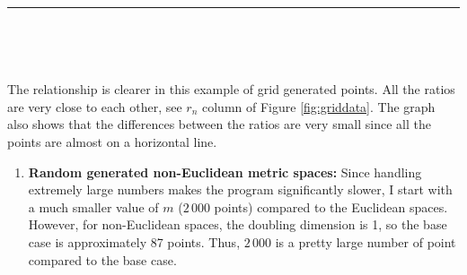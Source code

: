 \documentclass[12pt,english,]{article}
\providecommand{\tightlist}{%
  \setlength{\itemsep}{0pt}\setlength{\parskip}{0pt}}
\let\origfigure\figure
\let\endorigfigure\endfigure
\renewenvironment{figure}[1][2] {
    \expandafter\origfigure\expandafter[H]
} {
    \endorigfigure
}
\begin{document}
\begin{figure}
\begin{minipage}{0.95\textwidth}
\begin{center}
\end{center}
\end{minipage}
\caption[Caption]{The graph of ratios $r_n$ versus different values of $n$ of grid points with $n \in \{200\,000, 400\,000, 800\,000, 1\,600\,000, 3\,200\,000\}$ (with y-scale = $10^{-3}$).}
\label{fig:gridgraph}
\end{figure}

\hrule

~

~

The relationship is clearer in this example of grid generated points.
All the ratios are very close to each other, see \(r_n\) column of
Figure \ref{fig:griddata}. The graph also shows that the differences
between the ratios are very small since all the points are almost on a
horizontal line.

\begin{enumerate}
\def\labelenumi{\arabic{enumi}.}
\setcounter{enumi}{2}
\tightlist
\item
  \textbf{Random generated non-Euclidean metric spaces:} Since handling
  extremely large numbers makes the program significantly slower, I
  start with a much smaller value of \(m\) (\(2\,000\) points) compared
  to the Euclidean spaces. However, for non-Euclidean spaces, the
  doubling dimension is 1, so the base case is approximately 87 points.
  Thus, \(2\,000\) is a pretty large number of point compared to the
  base case.
\end{enumerate}
\end{document}

